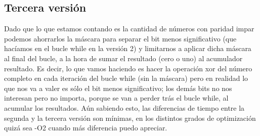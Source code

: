 \documentclass[a4paper, 11pt]{article}
\begin{document}
\subsection{Tercera versión}
Dado que lo que estamos contando es la cantidad de números con paridad impar podemos ahorrarlos la máscara para separar el bit menos significativo (que hacíamos en el bucle while en la versión 2) y limitarnos a aplicar dicha máscara al final del bucle, a la hora de sumar el resultado (cero o uno) al acumulador resultado. Es decir, lo que vamos haciendo es hacer la operación xor del número completo en cada iteración del bucle while (sin la máscara) pero en realidad lo que nos va a valer es sólo el bit menos significativo; los demás bits no nos interesan pero no importa, porque se van a perder trás el bucle while, al acumular los resultados. Aún sabiendo esto, las diferencias de tiempo entre la segunda y la tercera versión son mínimas, en los distintos grados de optimización quizá sea -O2 cuando más diferencia puedo apreciar.
\end{document}
